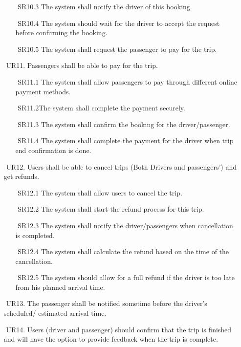 \documentclass[a4paper, 12pt]{article} %
\begin{document}
\begin{itemize}
\begin{itemize}
                    \item [$ $] SR10.3 The system shall notify the driver of this booking.
                    \item [$ $] SR10.4 The system should wait for the driver to accept the request before confirming the booking.
                    \item [$ $] SR10.5 The system shall request the passenger to pay for the trip.
                \end{itemize}
                \item [$ $] UR11. Passengers shall be able to pay for the trip.
                \begin{itemize}
                    \item [$ $] SR11.1 The system shall allow passengers to pay through different online payment methods.
                    \item [$ $] SR11.2The system shall complete the payment securely.
                    \item [$ $] SR11.3 The system shall confirm the booking for the driver/passenger.
                    \item [$ $] SR11.4 The system shall complete the payment for the driver when trip end confirmation is done.
                \end{itemize}
                \item [$ $] UR12. Users shall be able to cancel trips (Both Drivers and passengers’) and get refunds.
                \begin{itemize}
                    \item [$ $] SR12.1 The system shall allow users to cancel the trip.
                    \item [$ $] SR12.2 The system shall start the refund process for this trip.
                    \item [$ $] SR12.3 The system shall notify the driver/passengers when cancellation is completed.
                    \item [$ $] SR12.4 The system shall calculate the refund based on the time of the cancellation.
                    \item [$ $] SR12.5 The system should allow for a full refund if the driver is too late from his planned arrival time.
                \end{itemize}
                \item [$ $] UR13. The passenger shall be notified sometime before the driver's scheduled/ estimated arrival time.
                \item [$ $] UR14. Users (driver and passenger) should confirm that the trip is finished and will have the option to provide feedback when the trip is complete.

\end{itemize}
\end{document}
